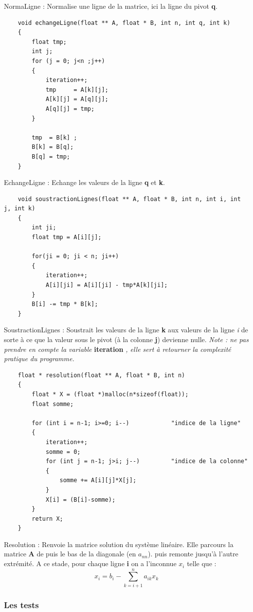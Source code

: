 \documentclass[a4paper]{article}
\begin{document}
NormaLigne : Normalise une ligne de la matrice, ici la ligne du pivot \textbf{q}.

\begin{lstlisting}
	void echangeLigne(float ** A, float * B, int n, int q, int k)
	{
		float tmp;
		int j;
		for (j = 0; j<n ;j++)
		{
			iteration++;
			tmp     = A[k][j];
			A[k][j] = A[q][j];
			A[q][j] = tmp;
		} 
		
		tmp  = B[k] ;
		B[k] = B[q];
		B[q] = tmp;
	}
\end{lstlisting}

EchangeLigne : Echange les valeurs de la ligne \textbf{q} et \textbf{k}.

\begin{lstlisting}
	void soustractionLignes(float ** A, float * B, int n, int i, int j, int k)
	{
		int ji;
		float tmp = A[i][j];
		
		for(ji = 0; ji < n; ji++)
		{
			iteration++;
			A[i][ji] = A[i][ji] - tmp*A[k][ji];
		}
		B[i] -= tmp * B[k];
	}
\end{lstlisting}

SoustractionLignes : Soustrait les valeurs de la ligne \textbf{k} aux valeurs de la ligne \textit{i} de sorte à ce que la valeur sous le pivot (à la colonne \textbf{j}) devienne nulle.
\newline
\textit{Note : ne pas prendre en compte la variable} \textbf{iteration} \textit{, elle sert à retourner la complexité pratique du programme.}
\clearpage
\begin{lstlisting}
	float * resolution(float ** A, float * B, int n)
	{
		float * X = (float *)malloc(n*sizeof(float)); 			
		float somme;
		
		for (int i = n-1; i>=0; i--)			"indice de la ligne"
		{
			iteration++;
			somme = 0;
			for (int j = n-1; j>i; j--)			"indice de la colonne"
			{
				somme += A[i][j]*X[j];
			}
			X[i] = (B[i]-somme);
		}
		return X;
	}
\end{lstlisting}

Resolution : Renvoie la matrice solution du système linéaire. Elle parcours la matrice \textbf{A} de puis le bas de la diagonale (en $a_{nn}$). puis remonte jusqu'à l'autre extrémité.
A ce stade, pour chaque ligne \textbf{i} on a l'inconnue $x_i$ telle que :
\[x_i = b_i - \sum_{k = i+1}^{n}a_{ik}x_k\]


\subsubsection{Les tests}
\end{document}
